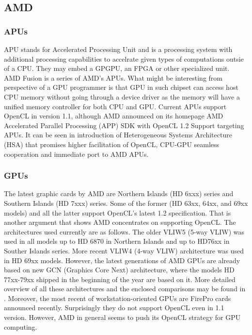 \subsection{AMD}

\subsubsection{APUs}
APU stands for Accelerated Processing Unit and is a processing system with additional processing capabilities to accelrate given types of computations outsie of a CPU. They may embed a GPGPU, an FPGA or other specialized unit. AMD Fusion is a series of AMD's APUs. What might be interesting from perspective of a GPU programmer is that GPU in such chipset can access host CPU memory without going through a device driver as the memory will have a unified memory controller for both CPU and GPU. Current APUs support OpenCL in version 1.1, although AMD announced on its homepage AMD Accelerated Parallel Processing (APP) SDK with OpenCL 1.2 Support targeting APUs. It can be seen in introduction of Heterogeneous Systems Architecture (HSA) that promises higher facilitation of OpenCL, CPU-GPU seamless cooperation and immediate port to AMD APUs.

\subsubsection{GPUs}
The latest graphic cards by AMD are Northern Islands (HD 6xxx) series and Southern Islands (HD 7xxx) series. Some of the former (HD 63xx, 64xx, and 69xx models) and all the latter support OpenCL's latest 1.2 specification. That is another argument that shows AMD concentrates on supporting OpenCL. The architectures used currently are as follows. The older VLIW5 (5-way VLIW) was used in all models up to HD 6870 in Northern Islands and up to HD76xx in Souther Islands series. More recent VLIW4 (4-way VLIW) architecture was used in HD 69xx models. However, the latest generations of AMD GPUs are already based on new GCN (Graphics Core Next) architecture, where the models HD 77xx-79xx shipped in the beginning of the year are based on it. More detailed overview of all these architectures and the enclosed comparisons may be found in \cite{nielsen2012}. Moreover, the most recent of workstation-oriented GPUs are FirePro cards announced recently. Surprisingly they do not support OpenCL even in 1.1 version. However, AMD in general seems to push its OpenCL strategy for GPU computing.

